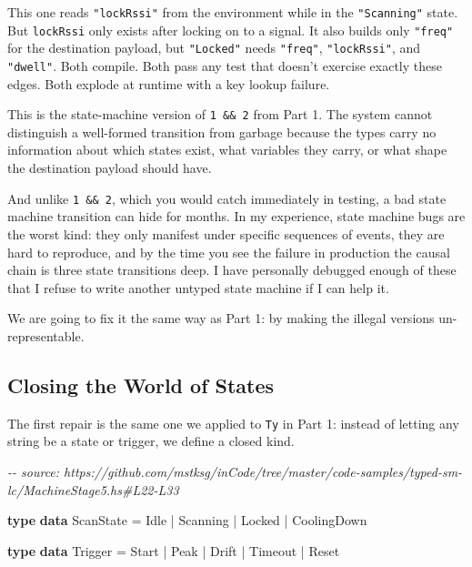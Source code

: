 \documentclass[]{article}
\newenvironment{Shaded}{}{}
\newcommand{\CommentTok}[1]{\textcolor[rgb]{0.38,0.63,0.69}{\textit{#1}}}
\newcommand{\DataTypeTok}[1]{\textcolor[rgb]{0.56,0.13,0.00}{#1}}
\newcommand{\KeywordTok}[1]{\textcolor[rgb]{0.00,0.44,0.13}{\textbf{#1}}}
\newcommand{\OperatorTok}[1]{\textcolor[rgb]{0.40,0.40,0.40}{#1}}
\newcommand{\OtherTok}[1]{\textcolor[rgb]{0.00,0.44,0.13}{#1}}
\begin{document}
This one reads \texttt{"lockRssi"} from the environment while in the
\texttt{"Scanning"} state. But \texttt{lockRssi} only exists after locking on to
a signal. It also builds only \texttt{"freq"} for the destination payload, but
\texttt{"Locked"} needs \texttt{"freq"}, \texttt{"lockRssi"}, and
\texttt{"dwell"}. Both compile. Both pass any test that doesn't exercise exactly
these edges. Both explode at runtime with a key lookup failure.

This is the state-machine version of \texttt{1\ \&\&\ 2} from Part 1. The system
cannot distinguish a well-formed transition from garbage because the types carry
no information about which states exist, what variables they carry, or what
shape the destination payload should have.

And unlike \texttt{1\ \&\&\ 2}, which you would catch immediately in testing, a
bad state machine transition can hide for months. In my experience, state
machine bugs are the worst kind: they only manifest under specific sequences of
events, they are hard to reproduce, and by the time you see the failure in
production the causal chain is three state transitions deep. I have personally
debugged enough of these that I refuse to write another untyped state machine if
I can help it.

We are going to fix it the same way as Part 1: by making the illegal versions
un-representable.

\subsection{Closing the World of States}\label{closing-the-world-of-states}

The first repair is the same one we applied to \texttt{Ty} in Part 1: instead of
letting any string be a state or trigger, we define a closed kind.

\begin{Shaded}
\begin{Highlighting}[]
\CommentTok{{-}{-} source: https://github.com/mstksg/inCode/tree/master/code{-}samples/typed{-}sm{-}lc/MachineStage5.hs\#L22{-}L33}

\KeywordTok{type} \KeywordTok{data} \DataTypeTok{ScanState}
  \OtherTok{=} \DataTypeTok{Idle}
  \OperatorTok{|} \DataTypeTok{Scanning}
  \OperatorTok{|} \DataTypeTok{Locked}
  \OperatorTok{|} \DataTypeTok{CoolingDown}

\KeywordTok{type} \KeywordTok{data} \DataTypeTok{Trigger}
  \OtherTok{=} \DataTypeTok{Start}
  \OperatorTok{|} \DataTypeTok{Peak}
  \OperatorTok{|} \DataTypeTok{Drift}
  \OperatorTok{|} \DataTypeTok{Timeout}
  \OperatorTok{|} \DataTypeTok{Reset}
\end{Highlighting}
\end{Shaded}
\end{document}
